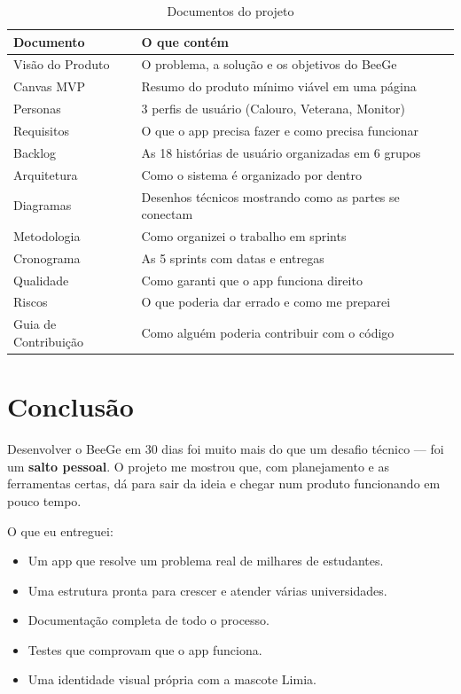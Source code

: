 \documentclass[12pt, a4paper]{article}
\begin{document}
\begin{table}[H]
\centering
\small
\renewcommand{\arraystretch}{1.12}
\caption{Documentos do projeto}
\begin{tabularx}{\textwidth}{l X}
\toprule
\textbf{Documento} & \textbf{O que cont\'{e}m} \\
\midrule
Vis\~{a}o do Produto & O problema, a solu\c{c}\~{a}o e os objetivos do BeeGe \\
Canvas MVP & Resumo do produto m\'{i}nimo vi\'{a}vel em uma p\'{a}gina \\
Personas & 3 perfis de usu\'{a}rio (Calouro, Veterana, Monitor) \\
Requisitos & O que o app precisa fazer e como precisa funcionar \\
Backlog & As 18 hist\'{o}rias de usu\'{a}rio organizadas em 6 grupos \\
Arquitetura & Como o sistema \'{e} organizado por dentro \\
Diagramas & Desenhos t\'{e}cnicos mostrando como as partes se conectam \\
Metodologia & Como organizei o trabalho em sprints \\
Cronograma & As 5 sprints com datas e entregas \\
Qualidade & Como garanti que o app funciona direito \\
Riscos & O que poderia dar errado e como me preparei \\
Guia de Contribui\c{c}\~{a}o & Como algu\'{e}m poderia contribuir com o c\'{o}digo \\
\bottomrule
\end{tabularx}
\end{table}

\newpage
\section{Conclus\~{a}o}

Desenvolver o BeeGe em 30 dias foi muito mais do que um desafio t\'{e}cnico --- foi um \textbf{salto pessoal}. O projeto me mostrou que, com planejamento e as ferramentas certas, d\'{a} para sair da ideia e chegar num produto funcionando em pouco tempo.

O que eu entreguei:

\begin{itemize}[leftmargin=2cm]
  \item Um app que resolve um problema real de milhares de estudantes.
  \item Uma estrutura pronta para crescer e atender v\'{a}rias universidades.
  \item Documenta\c{c}\~{a}o completa de todo o processo.
  \item Testes que comprovam que o app funciona.
  \item Uma identidade visual pr\'{o}pria com a mascote Limia.
\end{itemize}
\end{document}
